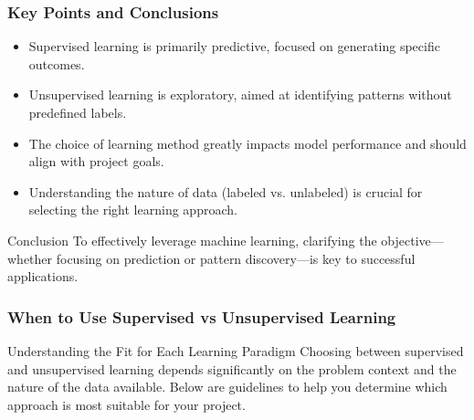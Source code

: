 \documentclass[aspectratio=169]{beamer}
\begin{document}
\begin{frame}[fragile]
    \frametitle{Key Points and Conclusions}
    \begin{itemize}
        \item Supervised learning is primarily predictive, focused on generating specific outcomes.
        \item Unsupervised learning is exploratory, aimed at identifying patterns without predefined labels.
        \item The choice of learning method greatly impacts model performance and should align with project goals.
        \item Understanding the nature of data (labeled vs. unlabeled) is crucial for selecting the right learning approach.
    \end{itemize}
    
    \begin{block}{Conclusion}
        To effectively leverage machine learning, clarifying the objective—whether focusing on prediction or pattern discovery—is key to successful applications.
    \end{block}
\end{frame}

\begin{frame}[fragile]
    \frametitle{When to Use Supervised vs Unsupervised Learning}
    \begin{block}{Understanding the Fit for Each Learning Paradigm}
        Choosing between supervised and unsupervised learning depends significantly on the problem context and the nature of the data available. Below are guidelines to help you determine which approach is most suitable for your project.
    \end{block}
\end{frame}
\end{document}

